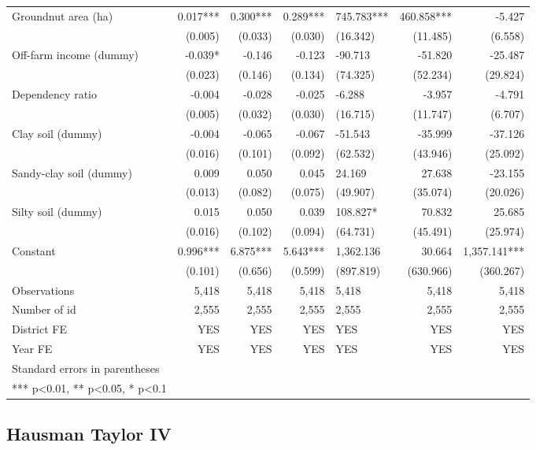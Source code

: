\documentclass[
]{article}
\begin{document}
\begin{landscape}
\begin{longtable}[t]{lrrrlrr}
Groundnut area (ha) & 0.017*** & 0.300*** & 0.289*** & 745.783*** & 460.858*** & -5.427\\
\addlinespace
 & (0.005) & (0.033) & (0.030) & (16.342) & (11.485) & (6.558)\\
Off-farm income (dummy) & -0.039* & -0.146 & -0.123 & -90.713 & -51.820 & -25.487\\
 & (0.023) & (0.146) & (0.134) & (74.325) & (52.234) & (29.824)\\
Dependency ratio & -0.004 & -0.028 & -0.025 & -6.288 & -3.957 & -4.791\\
 & (0.005) & (0.032) & (0.030) & (16.715) & (11.747) & (6.707)\\
\addlinespace
Clay soil (dummy) & -0.004 & -0.065 & -0.067 & -51.543 & -35.999 & -37.126\\
 & (0.016) & (0.101) & (0.092) & (62.532) & (43.946) & (25.092)\\
Sandy-clay soil (dummy) & 0.009 & 0.050 & 0.045 & 24.169 & 27.638 & -23.155\\
 & (0.013) & (0.082) & (0.075) & (49.907) & (35.074) & (20.026)\\
Silty soil (dummy) & 0.015 & 0.050 & 0.039 & 108.827* & 70.832 & 25.685\\
\addlinespace
 & (0.016) & (0.102) & (0.094) & (64.731) & (45.491) & (25.974)\\
Constant & 0.996*** & 6.875*** & 5.643*** & 1,362.136 & 30.664 & 1,357.141***\\
 & (0.101) & (0.656) & (0.599) & (897.819) & (630.966) & (360.267)\\
Observations & 5,418 & 5,418 & 5,418 & 5,418 & 5,418 & 5,418\\
Number of id & 2,555 & 2,555 & 2,555 & 2,555 & 2,555 & 2,555\\
\addlinespace
District FE & YES & YES & YES & YES & YES & YES\\
Year FE & YES & YES & YES & YES & YES & YES\\
Standard errors in parentheses &  &  &  &  &  & \\
*** p<0.01, ** p<0.05, * p<0.1 &  &  &  &  &  & \\*
\end{longtable}
\endgroup{}
\end{landscape}
\newpage

\hypertarget{hausman-taylor-iv}{%
\subsection{Hausman Taylor IV}\label{hausman-taylor-iv}}
\end{document}
